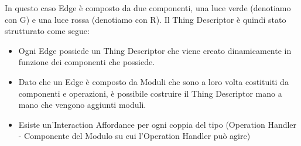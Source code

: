 \noindent In questo caso Edge è composto da due componenti, una luce verde (denotiamo con G) e una luce rossa (denotiamo con R). Il Thing Descriptor è quindi stato strutturato come segue:
\begin{itemize}
	\item Ogni Edge possiede un Thing Descriptor che viene creato dinamicamente in funzione dei componenti che possiede.
	\item Dato che un Edge è composto da Moduli che sono a loro volta costituiti da componenti e operazioni, è possibile costruire il Thing Descriptor mano a mano che vengono aggiunti moduli.
	\item Esiste un'Interaction Affordance per ogni coppia del tipo (Operation Handler - Componente del Modulo su cui l'Operation Handler può agire)
\end{itemize}

